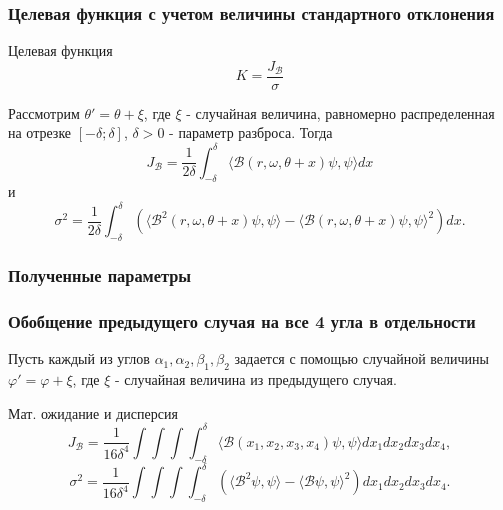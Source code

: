 \documentclass[11pt,pdf,hyperref={unicode}]{beamer}
\theoremstyle{definition}
\begin{document}
\begin{frame}
\frametitle{Целевая функция с учетом величины стандартного отклонения}
\begin{block}{Целевая функция}
\[
K = \frac{J_\mathcal{B} }{\sigma}
\]
\end{block}
Рассмотрим $\theta' = \theta + \xi$, где $\xi$ - случайная величина, равномерно распределенная на отрезке $[-\delta; \delta]$, $\delta > 0$ - параметр разброса. Тогда
\[
J_\mathcal{B} = \frac{1}{2\delta}\int_{-\delta}^\delta \langle \mathcal{B}(r, \omega, \theta + x)\psi, \psi \rangle dx
\] и
\[
\sigma^2 = \frac{1}{2\delta}\int_{-\delta}^\delta (\langle \mathcal{B}^2(r, \omega, \theta + x)\psi, \psi \rangle - \langle \mathcal{B}(r, \omega, \theta + x)\psi, \psi \rangle^2) dx.
\]
\end{frame}

\begin{frame}
\frametitle{Полученные параметры}
\begin{figure}[h]
\end{figure}
\end{frame}

\begin{frame}
\frametitle{Обобщение предыдущего случая на все 4 угла в отдельности}
Пусть каждый из углов $\alpha_1, \alpha_2, \beta_1, \beta_2$ задается с помощью случайной величины $\varphi' = \varphi + \xi$, где $\xi$ - случайная величина из предыдущего случая.
\begin{block}{Мат. ожидание и дисперсия}
\[
J_\mathcal{B} = \frac{1}{16\delta^4}\int\int\int\int_{-\delta}^\delta \langle \mathcal{B}(x_1, x_2, x_3, x_4)\psi, \psi \rangle dx_1dx_2dx_3dx_4,
\] 
\[
\sigma^2 = \frac{1}{16\delta^4}\int\int\int\int_{-\delta}^\delta (\langle \mathcal{B}^2\psi, \psi \rangle - \langle \mathcal{B}\psi, \psi \rangle^2) dx_1dx_2dx_3dx_4.
\]
\end{block}
\end{frame}
\end{document}
